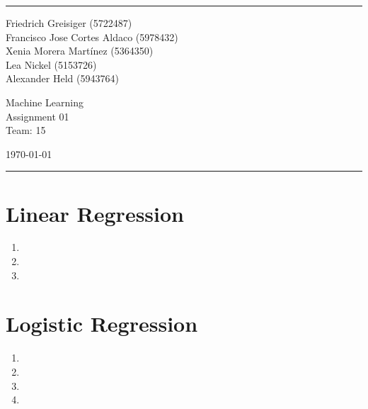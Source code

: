 \documentclass[a4paper]{article}
\begin{document}
\fancyhead[C]{}
\hrule \medskip
\begin{minipage}{0.295\textwidth} 
\raggedright
\footnotesize
Friedrich Greisiger (5722487)\hfill\\
Francisco Jose Cortes Aldaco (5978432)\hfill\\ 
Xenia Morera Martínez (5364350)\hfill\\
Lea Nickel (5153726)\hfill\\ 
Alexander Held (5943764)\hfill\\ 
\end{minipage}
\begin{minipage}{0.4\textwidth} 
\centering
\normalsize 
Machine Learning\\
\large 
Assignment 01\\ 
\normalsize 
Team: 15\\ 
\end{minipage}
\begin{minipage}{0.295\textwidth} 
\raggedleft
\today\hfill\\
\end{minipage}
\medskip\hrule 
\bigskip


\section{Linear Regression}
\begin{enumerate}
    \item 
    \item 
    \item 
\end{enumerate}



\section{Logistic Regression}
\begin{enumerate}
    \item 
    \item 
    \item 
    \item 
\end{enumerate}
\end{document}
